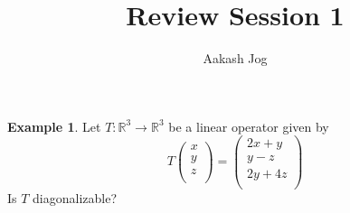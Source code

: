 \documentclass[fleqn, a4paper, 12pt]{article}
\title{Review Session 1}
\author{Aakash Jog}
\date{\formatdate{21}{1}{2015}}
\theoremstyle{definition}
\newtheorem{example}{Example} %
\theoremstyle{theorem}
\theoremstyle{remark}
\numberwithin{corollary}{theorem}
\numberwithin{equation}{theorem}
\begin{document}
\maketitle

\begin{example}
	Let $T : \mathbb{R}^3 \to \mathbb{R}^3$ be a linear operator given by
	\begin{equation*}
		T
			\begin{pmatrix}
				x\\
				y\\
				z\\
			\end{pmatrix}
		=
			\begin{pmatrix}
				2x + y\\
				y - z\\
				2y + 4z\\
			\end{pmatrix}
	\end{equation*}
	Is $T$ diagonalizable?
\end{example}
\end{document}
